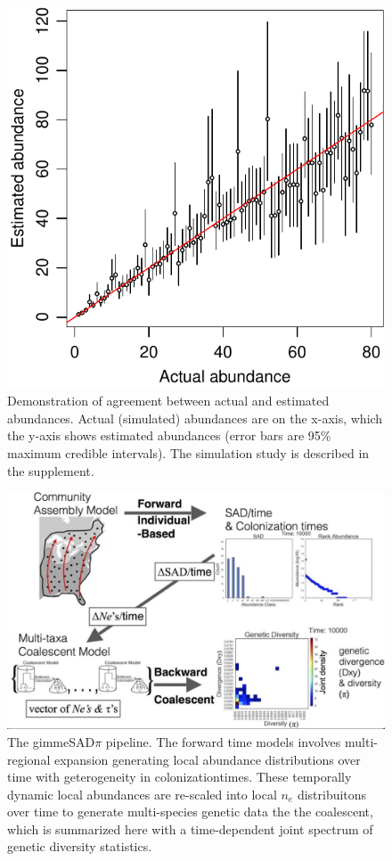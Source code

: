 \documentclass[12pt]{article}
\begin{document}
\begin{figure}[!hbp]
  \centering
  \includegraphics[scale=1]{fig_abundEst-1.pdf}
  \caption{Demonstration of agreement between actual and estimated
    abundances. Actual (simulated) abundances are on the x-axis, which
    the y-axis shows estimated abundances (error bars are 95\% maximum
    credible intervals). The simulation study is described in the
    supplement.}
  \label{fig:abundEst}
\end{figure}

\begin{figure}[!hbp]
  \centering
  \includegraphics[scale=0.4]{fig_gimmeSAD.png}
  \caption{The gimmeSAD$\pi$ pipeline. The forward time models
    involves multi-regional expansion generating local abundance
    distributions over time with geterogeneity in
    colonizationtimes. These temporally dynamic local abundances are
    re-scaled into local $n_e$ distribuitons over time to generate
    multi-species genetic data the the coalescent, which is summarized
    here with a time-dependent joint spectrum of genetic diversity
    statistics.}
  \label{fig:gimmeSAD}
\end{figure}
\end{document}
